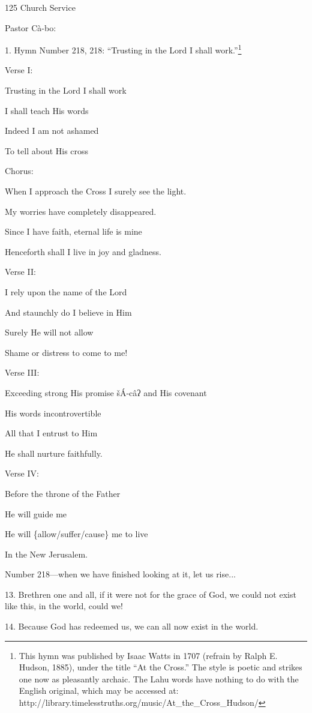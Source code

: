 
125 Church Service

Pastor Cà-bo:

1. Hymn Number 218, 218: ``Trusting in the Lord I shall work.''\footnote{This hymn was published by Isaac Watts in 1707 (refrain by Ralph E. Hudson, 1885), under the title ``At the Cross.'' The style is poetic and strikes one now as pleasantly archaic. The Lahu words have nothing to do with the English original, which may be accessed at: http://library.timelesstruths.org/music/At\_the\_Cross\_Hudson/}

Verse I:

Trusting in the Lord I shall work

I shall teach His words

Indeed I am not ashamed

To tell about His cross

Chorus:

When I approach the Cross I surely see the light.

My worries have completely disappeared.

Since I have faith, eternal life is mine

Henceforth shall I live in joy and gladness.

Verse II:

I rely upon the name of the Lord

And staunchly do I believe in Him

Surely He will not allow

Shame or distress to come to me!

Verse III:

Exceeding strong His promise šÁ-câʔ and His covenant

His words incontrovertible

All that I entrust to Him

He shall nurture faithfully.

Verse IV:

Before the throne of the Father

He will guide me

He will \{allow/suffer/cause\} me to live

In the New Jerusalem.

Number 218---when we have finished looking at it, let us rise...

13. Brethren one and all, if it were not for the grace of God, we could not exist
like this, in the world, could we!

14. Because God has redeemed us, we can all now exist in the world.

